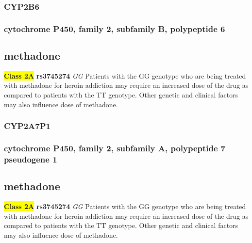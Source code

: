 \documentclass{book}
\begin{document}
\subsubsection{ CYP2B6 }
\subsubsection{ cytochrome P450, family 2, subfamily B, polypeptide 6 }

\subsection{ methadone }


\begin{center}


\textbf{\colorbox{yellow} {Class 2A}} \textbf{ rs3745274 } \textit{ GG }
Patients with the GG genotype who are being treated with methadone for heroin addiction may require an increased dose of the drug as compared to patients with the TT genotype. Other genetic and clinical factors may also influence dose of methadone.


\end{center}






\subsubsection{ CYP2A7P1 }
\subsubsection{ cytochrome P450, family 2, subfamily A, polypeptide 7 pseudogene 1 }

\subsection{ methadone }


\begin{center}


\textbf{\colorbox{yellow} {Class 2A}} \textbf{ rs3745274 } \textit{ GG }
Patients with the GG genotype who are being treated with methadone for heroin addiction may require an increased dose of the drug as compared to patients with the TT genotype. Other genetic and clinical factors may also influence dose of methadone.


\end{center}
\end{document}
